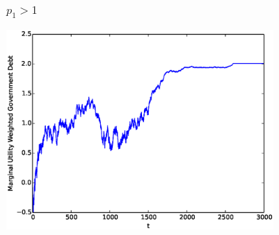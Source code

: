 \documentclass{beamer}
\begin{document}
 
 \begin{frame}
  
	\frametitle{$p_1 > 1$}
	\begin{center}
	\includegraphics[width=4in]{Images/port1.eps}
	\end{center}
\end{frame}
\end{document}
